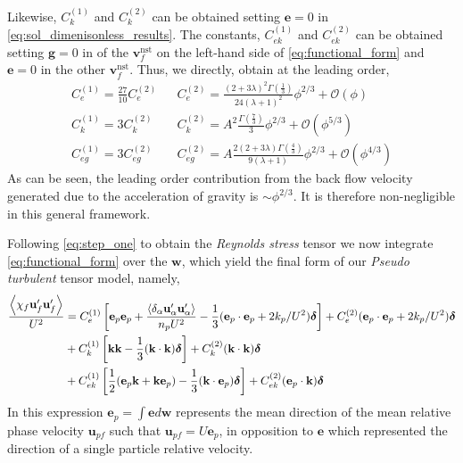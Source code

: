 Likewise, $C^{(1)}_k$ and $C^{(2)}_k$ can be obtained setting $\textbf{e}=0$ in \ref{eq:sol_dimenisonless_results}. 
The constants, $C^{(1)}_{ek}$ and $C^{(2)}_{ek}$ can be obtained setting $\textbf{g} = 0$ in of the $\textbf{v}_f^\text{nst}$ on the left-hand side of \ref{eq:functional_form} and $\textbf{e}=0$ in the other $\textbf{v}_f^\text{nst}$. 
Thus, we directly, obtain at the leading order, 
\begin{align}
    C_e^{(1)} =
    \frac{27}{10}
    C_e^{(2)}
    &&  C_e^{(2)} =
    \frac{(2+3\lambda)^2 \Gamma(\frac{1}{3})}{24(\lambda+1)^2}\phi^{2/3}
    + \mathcal{O}(\phi)
    \\
    C_k^{(1)} =
    3
    C_k^{(2)}
    && C_k^{(2)} =
    A^2 \frac{\Gamma(\frac{7}{3})}{3}\phi^{2/3}
    + \mathcal{O}(\phi^{5/3})
    \\
    C_{eg}^{(1)} =
    3
    C_{eg}^{(2)}
    && C_{eg}^{(2)} =
    A\frac{2 (2+3\lambda) \Gamma(\frac{4}{3})}{9(\lambda+1)}\phi^{2/3}
    + \mathcal{O}(\phi^{4/3})
    \label{eq:constants}
\end{align}
As can be seen, the leading order contribution from the back flow velocity generated due to the acceleration of gravity is $\sim \phi^{2/3}$. 
It is therefore non-negligible in this general framework. 


Following \ref{eq:step_one} to obtain the \textit{Reynolds stress} tensor we now integrate  \ref{eq:functional_form} over the $\textbf{w}$, which yield the final form of our \textit{Pseudo turbulent} tensor model, namely, 
\begin{align}
    \frac{\avg{\chi_f \textbf{u}_f'\textbf{u}_f'}}{U^2}
    &= 
    C^{(1)}_e \left[
        \textbf{e}_p\textbf{e}_p
        + \frac{\pavg{\textbf{u}_\alpha'\textbf{u}_\alpha'}}{n_p U^2}
         - \frac{1}{3}(\textbf{e}_p\cdot \textbf{e}_p+2k_p/U^2)\bm\delta
    \right]
    + C^{(2)}_e 
    (\textbf{e}_p\cdot \textbf{e}_p+2k_p/U^2)\bm\delta \nonumber \\
    &+ C^{(1)}_k  \left[
        \textbf{kk}
         - \frac{1}{3}(\textbf{k}\cdot \textbf{k})\bm\delta
    \right]
    +C^{(2)}_k 
    (\textbf{k}\cdot \textbf{k})\bm\delta \nonumber \\
    &+ C^{(1)}_{ek} \left[
        \frac{1}{2}
        (\textbf{e}_p\textbf{k}  + \textbf{k} \textbf{e}_p)
         - \frac{1}{3}(\textbf{k}\cdot \textbf{e}_p)\bm\delta
    \right]
    + C^{(2)}_{ek}
    (\textbf{e}_p\cdot \textbf{k})\bm\delta 
    \label{eq:functional_form_avg}
\end{align}
In this expression $\textbf{e}_p = \int \textbf{e} d\textbf{w} $ represents the mean direction of the mean relative phase velocity $\textbf{u}_{pf}$ such that $\textbf{u}_{pf} = U \textbf{e}_p$, in opposition to $\textbf{e}$ which represented the direction of a single particle relative velocity. 



